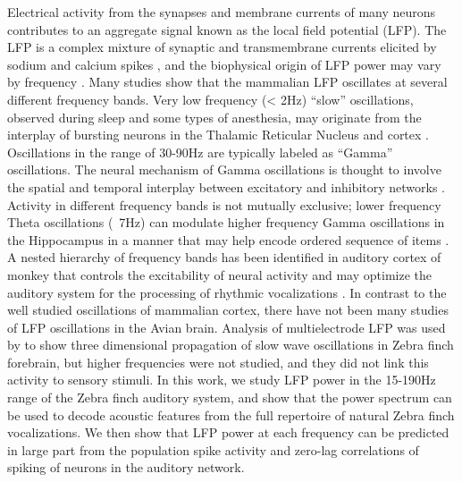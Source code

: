     Electrical activity from the synapses and membrane currents of many neurons contributes to an aggregate signal known as the local field potential (LFP). The LFP is a complex mixture of synaptic and transmembrane currents elicited by sodium and calcium spikes \cite{Buzsaki2012b}, and the biophysical origin of LFP power may vary by frequency \cite{Reimann2013}. Many studies show that the mammalian LFP oscillates at several different frequency bands. Very low frequency (< 2Hz) “slow” oscillations, observed during sleep and some types of anesthesia, may originate from the interplay of bursting neurons in the Thalamic Reticular Nucleus and cortex \cite{Lewis2015}. Oscillations in the range of 30-90Hz are typically labeled as “Gamma” oscillations. The neural mechanism of Gamma oscillations is thought to involve the spatial and temporal interplay between excitatory and inhibitory networks \cite{Buzsaki2012a}. Activity in different frequency bands is not mutually exclusive; lower frequency Theta oscillations (~7Hz) can modulate higher frequency Gamma oscillations in the Hippocampus in a manner that may help encode ordered sequence of items \cite{Lisman2013}. A nested hierarchy of frequency bands has been identified in auditory cortex of monkey that controls the excitability of neural activity and may optimize the auditory system for the processing of rhythmic vocalizations \cite{Lakatos2005}. In contrast to the well studied oscillations of mammalian cortex, there have not been many studies of LFP oscillations in the Avian brain. Analysis of multielectrode LFP was used by \cite{Beckers2014} to show three dimensional propagation of slow wave oscillations in Zebra finch forebrain, but higher frequencies were not studied, and they did not link this activity to sensory stimuli. In this work, we study LFP power in the 15-190Hz range of the Zebra finch auditory system, and show that the power spectrum can be used to decode acoustic features from the full repertoire of natural Zebra finch vocalizations. We then show that LFP power at each frequency can be predicted in large part from the population spike activity and zero-lag correlations of spiking of neurons in the auditory network.

